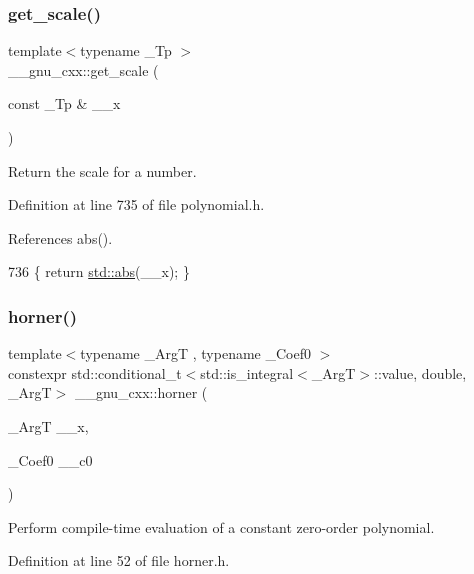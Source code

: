 \subsubsection{\texorpdfstring{get\+\_\+scale()}{get\_scale()}\hspace{0.1cm}{\footnotesize\ttfamily [2/2]}}
{\footnotesize\ttfamily template$<$typename \+\_\+\+Tp $>$ \\
\+\_\+\+\_\+gnu\+\_\+cxx\+::get\+\_\+scale (\begin{DoxyParamCaption}\item[{const \+\_\+\+Tp \&}]{\+\_\+\+\_\+x }\end{DoxyParamCaption})}

Return the scale for a number. 

Definition at line 735 of file polynomial.\+h.



References abs().


\begin{DoxyCode}
736     \{ \textcolor{keywordflow}{return} \hyperlink{namespace____gnu__cxx_ab9eb9db3560f504f8cd25a71bcb6ead5}{std::abs}(\_\_x); \}
\end{DoxyCode}
\mbox{\label{namespace____gnu__cxx_a2e77239e9d41f55a99755f285ba3d518}} 
\subsubsection{\texorpdfstring{horner()}{horner()}\hspace{0.1cm}{\footnotesize\ttfamily [1/2]}}
{\footnotesize\ttfamily template$<$typename \+\_\+\+ArgT , typename \+\_\+\+Coef0 $>$ \\
constexpr std\+::conditional\+\_\+t$<$std\+::is\+\_\+integral$<$\+\_\+\+ArgT$>$\+::value, double, \+\_\+\+ArgT$>$ \+\_\+\+\_\+gnu\+\_\+cxx\+::horner (\begin{DoxyParamCaption}\item[{\+\_\+\+ArgT}]{\+\_\+\+\_\+x,  }\item[{\+\_\+\+Coef0}]{\+\_\+\+\_\+c0 }\end{DoxyParamCaption})}

Perform compile-\/time evaluation of a constant zero-\/order polynomial. 

Definition at line 52 of file horner.\+h.



